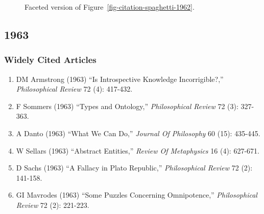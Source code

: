 \documentclass[
  10pt,
  letterpaper,
  DIV=11,
  numbers=noendperiod,
  twoside]{scrartcl}
\providecommand{\tightlist}{%
  \setlength{\itemsep}{0pt}\setlength{\parskip}{0pt}}\usepackage{longtable,booktabs,array}
\begin{document}
\begin{figure}


\caption{\label{fig-citation-facet-1962}Faceted version of
Figure~\ref{fig-citation-spaghetti-1962}.}

\end{figure}%

\newpage

\subsection{1963}\label{sec-s1963}

\subsubsection*{Widely Cited Articles}\label{widely-cited-articles-7}

\begin{enumerate}
\def\labelenumi{\arabic{enumi}.}
\tightlist
\item
  DM Armstrong (1963) ``Is Introspective Knowledge Incorrigible?,''
  \emph{Philosophical Review} 72 (4): 417-432.
\item
  F Sommers (1963) ``Types and Ontology,'' \emph{Philosophical Review}
  72 (3): 327-363.
\item
  A Danto (1963) ``What We Can Do,'' \emph{Journal Of Philosophy} 60
  (15): 435-445.
\item
  W Sellars (1963) ``Abstract Entities,'' \emph{Review Of Metaphysics}
  16 (4): 627-671.
\item
  D Sachs (1963) ``A Fallacy in Plato Republic,'' \emph{Philosophical
  Review} 72 (2): 141-158.
\item
  GI Mavrodes (1963) ``Some Puzzles Concerning Omnipotence,''
  \emph{Philosophical Review} 72 (2): 221-223.
\end{enumerate}
\end{document}
